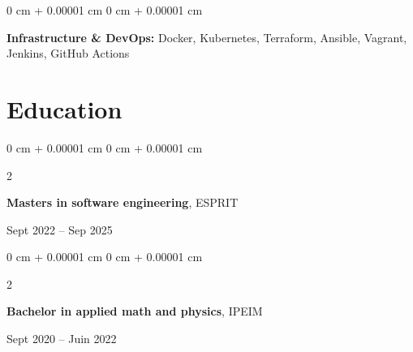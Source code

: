 \documentclass[10pt, letterpaper]{article}
\newenvironment{onecolentry}{
  \begin{adjustwidth}{
      0 cm + 0.00001 cm
    }{
      0 cm + 0.00001 cm
    }
  }{
  \end{adjustwidth}
} %
\newenvironment{twocolentry}[2][]{
  \onecolentry
  \def\secondColumn{#2}
  \setcolumnwidth{\fill, 4.5 cm}
  \begin{paracol}{2}
  }{
    \switchcolumn \raggedleft \secondColumn
  \end{paracol}
  \endonecolentry
} %
\begin{document}
  \begin{onecolentry}
    \textbf{Infrastructure \& DevOps:} Docker, Kubernetes, Terraform, Ansible, Vagrant, Jenkins, GitHub Actions
  \end{onecolentry}






  \section{Education}




  \begin{twocolentry}{
      Sept 2022 – Sep 2025
    }
    \textbf{Masters in software engineering}, ESPRIT
  \end{twocolentry}

  \vspace{0.10 cm}

  \begin{twocolentry}{
      Sept 2020 – Juin 2022
    }
    \textbf{Bachelor in applied math and physics}, IPEIM
  \end{twocolentry}




  
\end{document}
